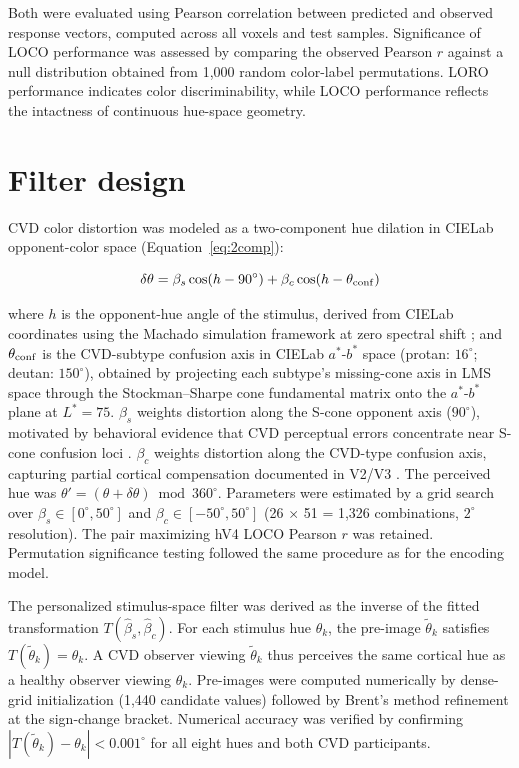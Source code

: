 Both were evaluated using Pearson correlation between predicted and observed response vectors, computed across all voxels and test samples. Significance of LOCO performance was assessed by comparing the observed Pearson $r$ against a null distribution obtained from 1,000 random color-label permutations. LORO performance indicates color discriminability, while LOCO performance reflects the intactness of continuous hue-space geometry.

\section{Filter design}
\label{sec:methods:filter}

CVD color distortion was modeled as a two-component hue dilation in CIELab opponent-color space (Equation~\ref{eq:2comp}):

\begin{equation}
\delta\theta = \beta_s \cos(h - 90^\circ) +
               \beta_c \cos(h - \theta_{\rm conf})
\label{eq:2comp}
\end{equation}

where $h$ is the opponent-hue angle of the stimulus, derived from CIELab coordinates using the Machado simulation framework at zero spectral shift \cite{machado2009}; and $\theta_{\rm conf}$ is the CVD-subtype confusion axis in CIELab $a^*$-$b^*$ space (protan: $16^\circ$; deutan: $150^\circ$), obtained by projecting each subtype's missing-cone axis in LMS space \cite{brettel1997} through the Stockman--Sharpe cone fundamental matrix \cite{stockman2000} onto the $a^*$-$b^*$ plane at $L^* = 75$. $\beta_s$ weights distortion along the S-cone opponent axis ($90^\circ$), motivated by behavioral evidence that CVD perceptual errors concentrate near S-cone confusion loci \cite{emery2021}. $\beta_c$ weights distortion along the CVD-type confusion axis, capturing partial cortical compensation documented in V2/V3 \cite{tregillus2021}. The perceived hue was $\theta' = (\theta + \delta\theta) \bmod 360^\circ$. Parameters were estimated by a grid search over $\beta_s \in [0^\circ, 50^\circ]$ and $\beta_c \in [-50^\circ, 50^\circ]$ (26 $\times$ 51 = 1,326 combinations, $2^\circ$ resolution). The pair maximizing hV4 LOCO Pearson $r$ was retained. Permutation significance testing followed the same procedure as for the encoding model.

The personalized stimulus-space filter was derived as the inverse of the fitted transformation $T(\hat{\beta}_s, \hat{\beta}_c)$. For each stimulus hue $\theta_k$, the pre-image $\tilde{\theta}_k$ satisfies $T(\tilde{\theta}_k) = \theta_k$. A CVD observer viewing $\tilde{\theta}_k$ thus perceives the same cortical hue as a healthy observer viewing $\theta_k$. Pre-images were computed numerically by dense-grid initialization (1,440 candidate values) followed by Brent's method refinement at the sign-change bracket. Numerical accuracy was verified by confirming $|T(\tilde{\theta}_k) - \theta_k| < 0.001^\circ$ for all eight hues and both CVD participants.

